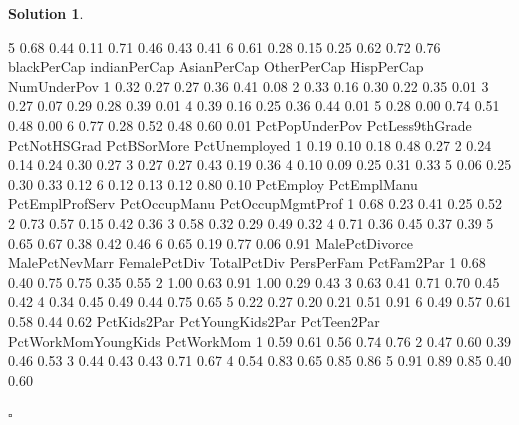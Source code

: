 \documentclass[twoside]{article}
\theoremstyle{definition}
\newtheorem*{solutionT}{Solution}
\newenvironment{solution}{\begin{cBox}\begin{solutionT}}{\hfill{\scriptsize\ensuremath{\square}}\end{solutionT}\end{cBox}}
\theoremstyle{definition}
\begin{document}
\begin{enumerate}
\begin{solution}
\begin{Schunk}
\begin{Soutput}
5       0.68       0.44        0.11       0.71      0.46      0.43        0.41
6       0.61       0.28        0.15       0.25      0.62      0.72        0.76
  blackPerCap indianPerCap AsianPerCap OtherPerCap HispPerCap NumUnderPov
1        0.32         0.27        0.27        0.36       0.41        0.08
2        0.33         0.16        0.30        0.22       0.35        0.01
3        0.27         0.07        0.29        0.28       0.39        0.01
4        0.39         0.16        0.25        0.36       0.44        0.01
5        0.28         0.00        0.74        0.51       0.48        0.00
6        0.77         0.28        0.52        0.48       0.60        0.01
  PctPopUnderPov PctLess9thGrade PctNotHSGrad PctBSorMore PctUnemployed
1           0.19            0.10         0.18        0.48          0.27
2           0.24            0.14         0.24        0.30          0.27
3           0.27            0.27         0.43        0.19          0.36
4           0.10            0.09         0.25        0.31          0.33
5           0.06            0.25         0.30        0.33          0.12
6           0.12            0.13         0.12        0.80          0.10
  PctEmploy PctEmplManu PctEmplProfServ PctOccupManu PctOccupMgmtProf
1      0.68        0.23            0.41         0.25             0.52
2      0.73        0.57            0.15         0.42             0.36
3      0.58        0.32            0.29         0.49             0.32
4      0.71        0.36            0.45         0.37             0.39
5      0.65        0.67            0.38         0.42             0.46
6      0.65        0.19            0.77         0.06             0.91
  MalePctDivorce MalePctNevMarr FemalePctDiv TotalPctDiv PersPerFam PctFam2Par
1           0.68           0.40         0.75        0.75       0.35       0.55
2           1.00           0.63         0.91        1.00       0.29       0.43
3           0.63           0.41         0.71        0.70       0.45       0.42
4           0.34           0.45         0.49        0.44       0.75       0.65
5           0.22           0.27         0.20        0.21       0.51       0.91
6           0.49           0.57         0.61        0.58       0.44       0.62
  PctKids2Par PctYoungKids2Par PctTeen2Par PctWorkMomYoungKids PctWorkMom
1        0.59             0.61        0.56                0.74       0.76
2        0.47             0.60        0.39                0.46       0.53
3        0.44             0.43        0.43                0.71       0.67
4        0.54             0.83        0.65                0.85       0.86
5        0.91             0.89        0.85                0.40       0.60

\end{Soutput}
\end{Schunk}
\end{solution}
\end{enumerate}
\end{document}
